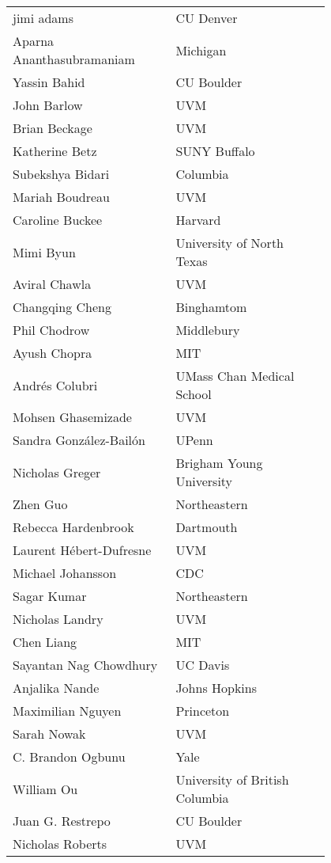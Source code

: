 \begin{center}
    \begin{longtable}{p{0.4\linewidth} p{0.4\linewidth} }
    jimi adams & CU Denver \\ 
    Aparna Ananthasubramaniam & Michigan \\ 
    Yassin Bahid & CU Boulder \\ 
    John Barlow & UVM \\ 
    Brian Beckage & UVM \\ 
    Katherine Betz & SUNY Buffalo \\ 
    Subekshya Bidari & Columbia \\ 
    Mariah Boudreau & UVM \\ 
    Caroline Buckee & Harvard \\ 
    Mimi Byun & University of North Texas \\ 
    Aviral Chawla & UVM \\ 
    Changqing Cheng & Binghamtom \\ 
    Phil Chodrow & Middlebury \\ 
    Ayush Chopra & MIT \\ 
    Andrés Colubri & UMass Chan Medical School \\ 
    Mohsen Ghasemizade & UVM \\ 
    Sandra González-Bailón & UPenn \\ 
    Nicholas Greger & Brigham Young University \\ 
    Zhen Guo & Northeastern \\ 
    Rebecca Hardenbrook & Dartmouth \\ 
    Laurent Hébert-Dufresne & UVM \\ 
    Michael Johansson & CDC \\ 
    Sagar Kumar & Northeastern \\ 
    Nicholas Landry & UVM \\ 
    Chen Liang & MIT \\ 
    Sayantan Nag Chowdhury & UC Davis \\ 
    Anjalika Nande & Johns Hopkins \\ 
    Maximilian Nguyen & Princeton \\ 
    Sarah Nowak & UVM \\ 
    C. Brandon Ogbunu & Yale \\ 
    William Ou & University of British Columbia \\ 
    Juan G. Restrepo & CU Boulder \\ 
    Nicholas Roberts & UVM \\ 

\end{longtable}
\end{center}
